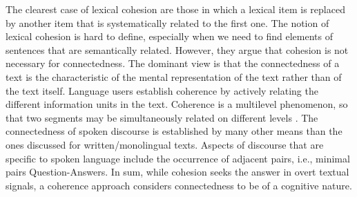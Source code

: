  The clearest case of lexical cohesion are those in which a lexical item is replaced by another item that is systematically related to the first one. 
 The notion of lexical cohesion is hard to define, especially when we need to find elements of sentences that are semantically related. 
 However, they argue that cohesion is not necessary for connectedness. 
 The dominant view is that the connectedness of a text is the characteristic of the mental representation of the text rather than of the text itself. 
Language users establish coherence by actively relating the different information units in the text. 
Coherence is a multilevel phenomenon, so that two segments may be simultaneously related on different levels \cite{sandres06}.
The connectedness of spoken discourse is established by many other means than the ones discussed for written/monolingual texts. 
Aspects of discourse that are specific to spoken language include the occurrence of adjacent pairs, i.e., minimal pairs Question-Answers. 
In sum, while cohesion seeks the answer in overt textual signals, a coherence approach considers connectedness to be of a cognitive nature.     


